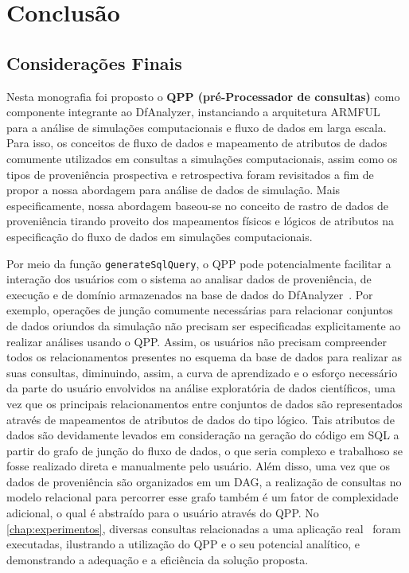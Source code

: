 
\chapter{Conclusão}%
\label{chap:conclusao}

\section{Considerações Finais}

Nesta monografia foi proposto o \textbf{QPP (pré-Processador de consultas)} como componente integrante ao DfAnalyzer, instanciando a arquitetura ARMFUL~\cite{silva2017raw} para a análise de simulações computacionais e fluxo de dados em larga escala. Para isso, os conceitos de fluxo de dados e mapeamento de atributos de dados comumente utilizados em consultas a simulações computacionais, assim como os tipos de proveniência prospectiva e retrospectiva foram revisitados a fim de propor a nossa abordagem para análise de dados de simulação. Mais especificamente, nossa abordagem baseou-se no conceito de rastro de dados de proveniência tirando proveito dos mapeamentos físicos e lógicos de atributos na especificação do fluxo de dados em simulações computacionais. 

Por meio da função \texttt{generateSqlQuery}, o QPP pode potencialmente facilitar a interação dos usuários com o sistema ao analisar dados de proveniência, de execução e de domínio armazenados na base de dados do DfAnalyzer~\cite{gadelha2012mtcprov}. Por exemplo, operações de junção comumente necessárias para relacionar conjuntos de dados oriundos da simulação não precisam ser especificadas explicitamente ao realizar análises usando o QPP. Assim, os usuários não precisam compreender todos os relacionamentos presentes no esquema da base de dados para realizar as suas consultas, diminuindo, assim, a curva de aprendizado e o esforço necessário da parte do usuário envolvidos na análise exploratória de dados científicos, uma vez que os principais relacionamentos entre conjuntos de dados são representados através de mapeamentos de atributos de dados do tipo lógico. Tais atributos de dados são devidamente levados em consideração na geração do código em SQL a partir do grafo de junção do fluxo de dados, o que seria complexo e trabalhoso se fosse realizado direta e manualmente pelo usuário.
Além disso, uma vez que os dados de proveniência são organizados em um DAG, a realização de consultas no modelo relacional para percorrer esse grafo também é um fator de complexidade adicional, o qual é abstraído para o usuário através do QPP.
No \autoref{chap:experimentos}, diversas consultas relacionadas a uma aplicação real~\cite{silva2016situ} foram executadas, ilustrando a utilização do QPP e o seu potencial analítico, e demonstrando a adequação e a eficiência da solução proposta.

